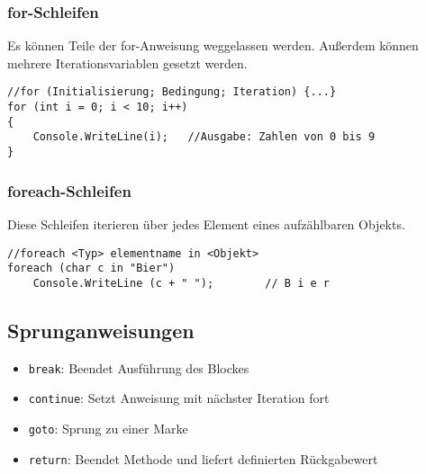 \subsubsection{for-Schleifen}
Es können Teile der for-Anweisung weggelassen werden. Außerdem können mehrere Iterationsvariablen gesetzt werden.
\begin{lstlisting}
//for (Initialisierung; Bedingung; Iteration) {...}
for (int i = 0; i < 10; i++)
{
	Console.WriteLine(i);	//Ausgabe: Zahlen von 0 bis 9
}
\end{lstlisting}
\subsubsection{foreach-Schleifen}
Diese Schleifen iterieren über jedes Element eines aufzählbaren Objekts.
\begin{lstlisting}
//foreach <Typ> elementname in <Objekt>
foreach (char c in "Bier")
	Console.WriteLine (c + " ");		// B i e r
\end{lstlisting}
\subsection{Sprunganweisungen}
\begin{itemize}
\item \texttt{break}: Beendet Ausführung des Blockes
\item \texttt{continue}: Setzt Anweisung mit nächster Iteration fort
\item \texttt{goto}: Sprung zu einer Marke
\item \texttt{return}: Beendet Methode und liefert definierten Rückgabewert
\end{itemize}




